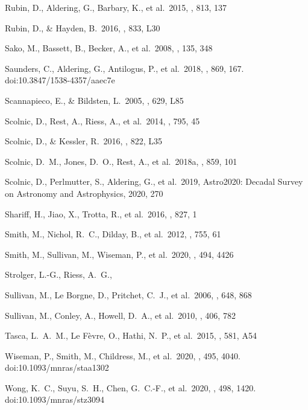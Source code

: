\documentclass[]{aa}
\begin{document}
\begin{thebibliography}{}
 Rubin, D., Aldering, G., Barbary, K., et
al.\ 2015, \apj, 813, 137

 Rubin, D., \& Hayden, B.\ 2016,
\apjl, 833, L30


 Sako, M., Bassett, B., Becker, A., et al.\
2008, \aj, 135, 348

 Saunders, C., Aldering, G.,
Antilogus, P., et al.\ 2018, \apj, 869, 167. doi:10.3847/1538-4357/aaec7e

 Scannapieco, E., \&
Bildsten, L.\ 2005, \apjl, 629, L85 

 Scolnic, D., Rest, A., Riess, A., et
al.\ 2014, \apj, 795, 45

 Scolnic, D., \& Kessler, R.\
2016, \apjl, 822, L35

 Scolnic, D.~M., Jones, D.~O., Rest,
A., et al.\ 2018a, \apj, 859, 101

 Scolnic, D., Perlmutter, S.,
Aldering, G., et al.\ 2019, Astro2020: Decadal Survey on Astronomy and
Astrophysics, 2020, 270

 Shariff, H., Jiao, X., Trotta, R.,
et al.\ 2016, \apj, 827, 1

 Smith, M., Nichol, R.~C., Dilday, B., et
al.\ 2012, \apj, 755, 61

 Smith, M., Sullivan, M., Wiseman, P., et
al.\ 2020, \mnras, 494, 4426

 Strolger, L.-G., Riess, A.~G.,

\bibitem[Sullivan et al.(2006)]{sullivan2006} Sullivan, M., Le Borgne, D.,
Pritchet, C.~J., et al.\ 2006, \apj, 648, 868 

 Sullivan, M., Conley, A., Howell,
D.~A., et al.\ 2010, \mnras, 406, 782


 Tasca, L.~A.~M., Le F{\`e}vre, O.,
Hathi, N.~P., et al.\ 2015, \aap, 581, A54


 Wiseman, P., Smith, M., Childress,
M., et al.\ 2020, \mnras, 495, 4040. doi:10.1093/mnras/staa1302

\bibitem[Wong et al.(2020)]{wong2019} Wong, K.~C., Suyu, S.~H., Chen, G.~C.-F.,
et al.\ 2020, \mnras, 498, 1420. doi:10.1093/mnras/stz3094

\end{thebibliography}
\end{document}
